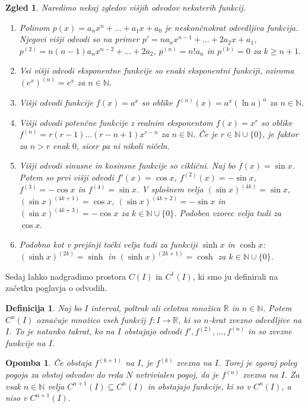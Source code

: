 \documentclass[10pt, a4paper]{article}
\newtheorem{defi}[izr]{Definicija}
\newenvironment{noticeB}{%
  \tcolorbox[%
  notitle,
  empty,
  enhanced,  %
  breakable,
  coltext=black,
  colback=white, 
  fontupper=\rmfamily,
  noparskip,
  sharp corners,
  boxrule=-1pt,  %
  frame hidden,
  left=7pt,  %
  right=7pt,
  top=5pt,
  bottom=5pt,
  before skip=2.5ex plus 2pt,
  after skip=2.5ex plus 2pt,
  borderline west = {1.5pt}{-0.1pt}{blue!30!black}, %
  overlay unbroken and last={%
    \draw[color=black, line width=1.25pt]
    ($(frame.south west)+(1.pt, -0.1pt)$) -- ++(2em, 0);
  }
  ]}
{\endtcolorbox}
\newenvironment{definicija}{\begin{noticeB}\begin{defi}}{%
\end{defi}\end{noticeB}}
\newtheorem*{opomba}{Opomba}
\newtheorem{zgled}[izr]{Zgled}
\newcommand{\N}{\mathbb {N}}
\newcommand{\R}{\mathbb {R}}
\begin{document}
\begin{zgled}
    Naredimo nekaj zgledov višjih odvodov nekaterih funkcij.
    \begin{enumerate}
        \item Polinom $p(x) = a_n x^n + \dots + a_1 x + a_0$ je neskončnokrat odvedljiva funkcija.
        Njegovi višji odvodi so na primer $p' = n a_n x^{n-1} +\dots + 2 a_2 x + a_1$, $p^{(2)} = n(n-1) a_n x^{n-2} + \dots + 2 a_2$, $p^{(n)} = n! a_n$ in $p^{(k)} = 0$ za $k \geq n+1.$
        \item Vsi višji odvodi eksponentne funkcije so enaki eksponentni funkciji, oziroma $(e^x)^{(n)} = e^x$ za $n \in \N.$
        \item Višji odvodi funkcije $f(x) = a^x$ so oblike $f^{(n)} (x) = a^x (\ln a)^n$ za $n \in \N.$
        \item Višji odvodi potenčne funkcije z realnim eksponentom $f(x) = x^r$ so oblike $f^{(n)} = r (r-1) \dots (r-n + 1) x^{r-n}$ za $n \in \N$. 
        Če je $r \in \N \cup \{0\}$, je faktor za $n > r$ enak $0$, sicer pa ni nikoli ničeln.
        \item Višji odvodi sinusne in kosinsne funkcije so ciklični. 
        Naj bo $f(x) = \sin x$. 
        Potem so prvi višji odvodi $f'(x) = \cos x$, $f^{(2)} (x) = - \sin x$, $f^{(3)} = - \cos x$ in $f^{(4)} = \sin x$.
        V splošnem velja $(\sin x)^{(4k)} = \sin x$, $(\sin x)^{(4k + 1)} = \cos x$, $(\sin x)^{(4k + 2)} = - \sin x$ in $(\sin x)^{(4k + 3)} = - \cos x$ za $k \in \N \cup \{0\}$.
        Podoben vzorec velja tudi za $\cos x.$
        \item Podobno kot v prejšnji točki velja tudi za funkciji $\sinh x$ in $\cosh x$: $(\sinh x)^{(2k)} = \sinh$ in $(\sinh x)^{(2k + 1)} = \cosh$ za $k \in \N \cup \{0\}$.
    \end{enumerate}
\end{zgled}

Sedaj lahko nadgradimo prostora $C(I)$ in $C^1(I)$, ki smo ju definirali na začetku poglavja o odvodih.

\begin{definicija}
    Naj bo $I$ interval, poltrak ali celotna množica $\R$ in $n \in \N.$ 
    Potem $C^{n} (I)$ označuje množico vseh funkcij $f : I \rightarrow \R$, ki so $n$-krat zvezno odvedljive na $I$.
    To je natanko takrat, ko na $I$ obstajajo odvodi $f', f^{(2)}, \ldots, f^{(n)}$ in so zvezne funkcije na $I$.
\end{definicija}

\begin{opomba}
    Če obstaja $f^{(k+1)}$ na $I$, je $f^(k)$ zvezna na $I$. 
    Torej je zgoraj poleg pogoja za obstoj odvodov do reda $N$ netrivialen pogoj, da je $f^{(n)}$ zvezna na $I$.
    Za vsak $n \in \N$ velja $C^{n+1}(I) \subseteq C^{n} (I)$ in obstajajo funkcije, ki so v $C^n (I)$, a niso v $C^{n+1}(I).$ 
\end{opomba}
\end{document}
